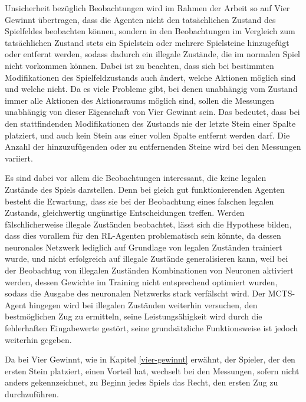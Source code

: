 Unsicherheit bezüglich Beobachtungen wird im Rahmen der Arbeit so auf Vier Gewinnt übertragen, dass die Agenten nicht den tatsächlichen Zustand des Spielfeldes beobachten können, sondern in den Beobachtungen im Vergleich zum tatsächlichen Zustand stets ein Spielstein oder mehrere Spielsteine hinzugefügt oder entfernt werden, sodass dadurch ein illegale Zustände, die im normalen Spiel nicht vorkommen können. Dabei ist zu beachten, dass sich bei bestimmten Modifikationen des Spielfeldzustands auch ändert, welche Aktionen möglich sind und welche nicht. Da es viele Probleme gibt, bei denen unabhängig vom Zustand immer alle Aktionen des Aktionsraums möglich sind, sollen die Messungen unabhängig von dieser Eigenschaft von Vier Gewinnt sein. Das bedeutet, dass bei den stattfindenden Modifikationen des Zustands nie der letzte Stein einer Spalte platziert, und auch kein Stein aus einer vollen Spalte entfernt werden darf. Die Anzahl der hinzuzufügenden oder zu entfernenden Steine wird bei den Messungen variiert.

Es sind dabei vor allem die Beobachtungen interessant, die keine legalen Zustände des Spiels darstellen. Denn bei gleich gut funktionierenden Agenten besteht die Erwartung, dass sie bei der Beobachtung eines falschen legalen Zustands, gleichwertig ungünstige Entscheidungen treffen. Werden fälschlicherweise illegale Zuständen beobachtet, lässt sich die Hypothese bilden, dass dies vorallem für den RL-Agenten problematisch sein könnte, da dessen neuronales Netzwerk lediglich auf Grundlage von legalen Zuständen trainiert wurde, und nicht erfolgreich auf illegale Zustände generalisieren kann, weil bei der Beobachtug von illegalen Zuständen Kombinationen von Neuronen aktiviert werden, dessen Gewichte im Training nicht entsprechend optimiert wurden, sodass die Ausgabe des neuronalen Netzwerks stark verfälscht wird. Der MCTS-Agent hingegen wird bei illegalen Zuständen weiterhin versuchen, den bestmöglichen Zug zu ermitteln, seine Leistungsähigkeit wird durch die fehlerhaften Eingabewerte gestört, seine grundsätzliche Funktionsweise ist jedoch weiterhin gegeben.

Da bei Vier Gewinnt, wie in Kapitel \ref{vier-gewinnt} erwähnt, der Spieler, der den ersten Stein platziert, einen Vorteil hat, wechselt bei den Messungen, sofern nicht anders gekennzeichnet, zu Beginn jedes Spiels das Recht, den ersten Zug zu durchzuführen.

